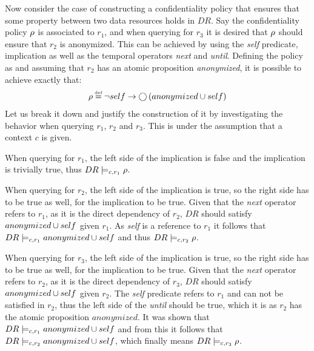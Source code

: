 \begin{example}
Now consider the case of constructing a confidentiality policy that ensures that some property between two data resources holds in $DR$. Say the confidentiality policy $\rho$ is associated to $r_1$, and when querying for $r_3$ it is desired that $\rho$ should ensure that $r_2$ is anonymized. This can be achieved by using the \emph{self} predicate, implication as well as the temporal operators \emph{next} and \emph{until}. Defining the policy as and assuming that $r_2$ has an atomic proposition \emph{anonymized}, it is possible to achieve exactly that:
\begin{align*}
    \conf \eqdef \lnot self \imply \X \left( anonymized \U self \right)
\end{align*}
Let us break it down and justify the construction of it by investigating the behavior when querying $r_1$, $r_2$ and $r_3$. This is under the assumption that a context $c$ is given.

When querying for $r_1$, the left side of the implication is false and the implication is trivially true, thus $DR \models_{c,r_1} \rho$. 

When querying for $r_2$, the left side of the implication is true, so the right side has to be true as well, for the implication to be true. Given that the \emph{next} operator refers to $r_1$, as it is the direct dependency of $r_2$, $DR$ should satisfy $anonymized \cup self$ given $r_1$. As \emph{self} is a reference to $r_1$ it follows that $DR \models_{c,r_1} anonymized \cup self$ and thus $DR \models_{c,r_2} \rho$.

When querying for $r_3$, the left side of the implication is true, so the right side has to be true as well, for the implication to be true. Given that the \emph{next} operator refers to $r_2$, as it is the direct dependency of $r_3$, $DR$ should satisfy $anonymized \cup self$ given $r_2$. The \emph{self} predicate refers to $r_1$ and can not be satisfied in $r_2$, thus the left side of the \emph{until} should be true, which it is as $r_2$ has the atomic proposition $anonymized$. It was shown that $DR \models_{c,r_1} anonymized \cup self$ and from this it follows that $DR \models_{c,r_2} anonymized \cup self$, which finally means $DR \models_{c,r_3} \rho$.
\end{example}

